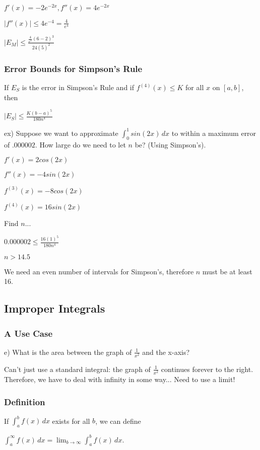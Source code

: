 \documentclass{article}
\begin{document}
$f'(x) = -2e^{-2x}, f''(x) = 4e^{-2x}$

$|f''(x)|\leq 4e^{-4} = \frac{4}{e^4}$

$|E_M| \leq \frac{\frac{4}{e^4}(6-2)^3}{24(5)^2}$

\subsubsection{Error Bounds for Simpson's Rule}
If $E_S$ is the error in Simpson's Rule and if $f^{(4)}(x) \leq K$ for all $x$ on $[a,b]$, then 
\begin{center}
    $|E_S| \leq \frac{K(b-a)^5}{180n^4}$
\end{center}

ex) Suppose we want to approximate $\int_{0}^{1} sin(2x) \,dx$ to within a maximum error of $.000002$. How large do we need to let $n$ be? (Using Simpson's).

$f'(x) = 2cos(2x)$ 

$f''(x) = -4sin(2x)$

$f^{(3)}(x) = -8cos(2x)$

$f^{(4)}(x) = 16sin(2x)$

Find $n$...

$0.000002 \leq \frac{16(1)^5}{180n^4}$

$n > 14.5$

We need an even number of intervals for Simpson's, therefore $n$
 must be at least 16.
 
\subsection{Improper Integrals}

\subsubsection{A Use Case}

e) What is the area between the graph of $\frac{1}{x^2}$ and the x-axis?

Can't just use a standard integral: the graph of $\frac{1}{x^2}$ continues forever to the right. Therefore, we have to deal with infinity in some way... Need to use a limit!

\subsubsection{Definition}
If $\int_{a}^{b} f(x) \,dx$ exists for all $b$, we can define 

\begin{center}
    $\int_{a}^{\infty} f(x) \,dx = \lim_{b\to\infty} \int_{a}^{b} f(x) \,dx$.
\end{center}
\end{document}
